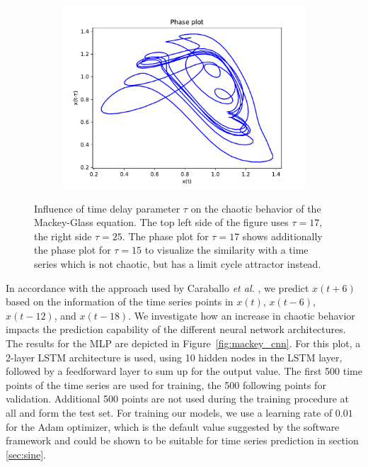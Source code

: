 \documentclass{article}
\begin{document}
\begin{figure}
\begin{subfigure}{.5\textwidth}
        \includegraphics[width=\linewidth]{figures/25.pdf}
    \end{subfigure}
    \caption{Influence of time delay parameter $\tau$ on the chaotic behavior of
        the Mackey-Glass equation. The top left side of the figure
        uses $\tau = 17$, the right side $\tau = 25$. The phase plot for 
        $\tau=17$ shows additionally the phase plot for $\tau=15$ to visualize 
        the similarity with a time series which is not chaotic, but has 
        a limit cycle attractor instead.}
    \label{fig:mackey_chaos}
\end{figure}

In accordance with the approach used by Caraballo \textit{et al.}
\cite{caraballo2016}, we predict $x(t+6)$ based on the information of the time
series points in $x(t)$, $x(t-6)$, $x(t-12)$, and $x(t-18)$. We investigate how
an increase in chaotic behavior impacts the prediction capability of the
different neural network architectures. The results for the MLP
are depicted in Figure~\ref{fig:mackey_cnn}. For this plot, a 2-layer
LSTM architecture is used, using 10 hidden nodes in the LSTM layer,
followed by a feedforward layer to sum up for the output value.
The first 500 time points of the time series are used for training, the 500
following points for validation. Additional 500 points are not used during the
training procedure at all and form the test set. For training our models, we
use a learning rate of $0.01$ for the Adam optimizer, which is the default
value suggested by the software framework and could be shown to be suitable for
time series prediction in section \ref{sec:sine}.
\end{document}
